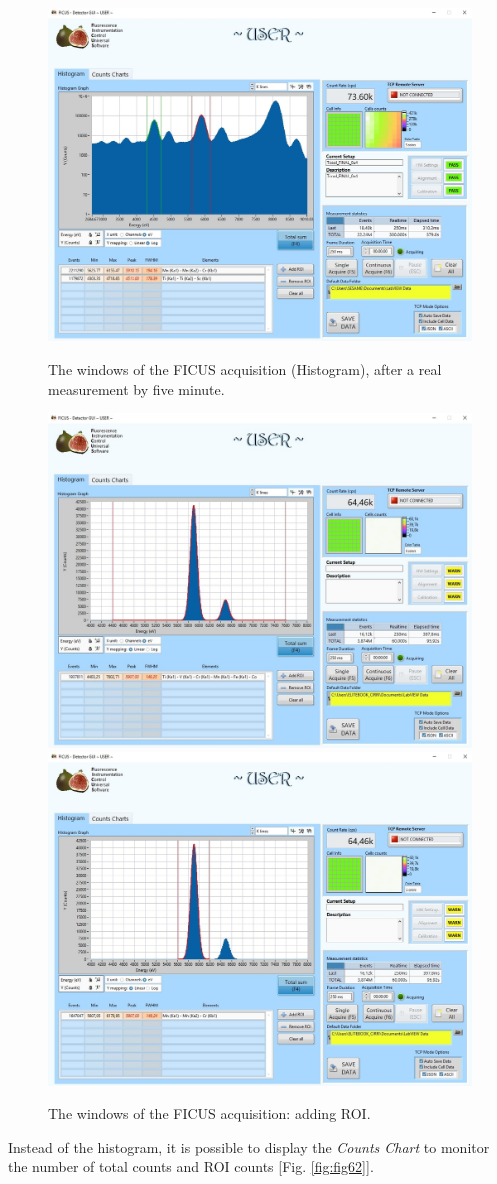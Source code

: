 \documentclass[a4paper,12pt,oneside,pdflatex,italian,final,twocolumn]{article}
\begin{document}
\begin{figure}[h!]
\centering
{\includegraphics[width=.7\textwidth]{Capture35.jpg}} \quad
\caption{The windows of the FICUS acquisition (Histogram), after a real measurement by five minute.}\label{fig:fig60bis}
\end{figure}

\begin{figure}[h!]
\centering
\subfloat
{\includegraphics[width=.48\textwidth]{Cattura114.jpg}} \quad
\subfloat
{\includegraphics[width=.48\textwidth]{Cattura115.jpg}} \\
\caption{The windows of the FICUS acquisition: adding ROI.}\label{fig:fig61}
\end{figure}

Instead of the histogram, it is possible to display the \textit{Counts Chart} to monitor the number of total counts and ROI counts [Fig. \ref{fig:fig62}].
\end{document}
